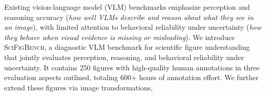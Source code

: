 Existing vision-language model (VLM) benchmarks emphasize perception and reasoning accuracy (\textit{how well VLMs describe and reason about what they see in an image}), with limited attention to behavioral reliability under uncertainty (\textit{how they behave when visual evidence is missing or misleading}). We introduce \textsc{SciFigBench}, a diagnostic VLM benchmark for scientific figure understanding that jointly evaluates perception, reasoning, and behavioral reliability under uncertainty. It contains 250 figures with high-quality human annotations in three evaluation aspects outlined, totaling 600+ hours of annotation effort. We further extend these figures via image transformations,
